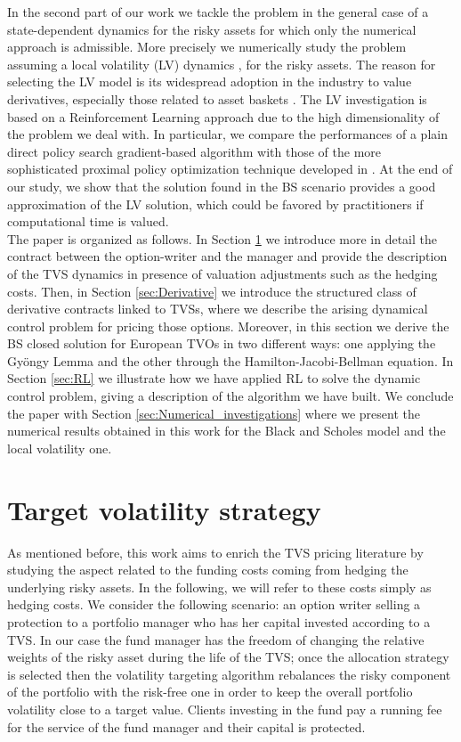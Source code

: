 \documentclass[runningheads]{m2ef}
\begin{document}
	In the second part of our work we tackle the problem in the general case of a state-dependent dynamics for the risky assets for which only the numerical approach is admissible.
	More precisely we numerically study the problem assuming a local volatility (LV) dynamics \cite{Derman1994}, \cite{Dupire1994} for the risky assets. The reason for selecting the LV model is its widespread adoption in the industry to value derivatives, especially those related to asset baskets \cite{Gatheral2006}. The LV investigation is based on a Reinforcement Learning approach due to the high dimensionality of the problem we deal with. In particular, we compare the performances of a plain direct policy search gradient-based algorithm \cite{Sutton2018} with those of the more sophisticated proximal policy optimization technique developed in \cite{Schulman2017}. At the end of our study, we show that the solution found in the BS scenario provides a good approximation of the LV solution, which could be favored by practitioners if computational time is valued.
	\\

	The paper is organized as follows. In Section \ref{sec:TVS} we introduce more in detail the contract between the option-writer and the manager and provide the description of the TVS dynamics in presence of valuation adjustments such as the hedging costs. Then, in Section \ref{sec:Derivative} we introduce the structured class of derivative contracts linked to TVSs, where we describe the arising dynamical control problem for pricing those options. Moreover, in this section we derive the BS closed solution for European TVOs in two different ways: one applying the Gy\"ongy Lemma and the other through the Hamilton-Jacobi-Bellman equation. In Section \ref{sec:RL} we illustrate how we have applied RL to solve the dynamic control problem, giving a description of the algorithm we have built. We conclude the paper with Section \ref{sec:Numerical_investigations} where we present the numerical results obtained in this work for the Black and Scholes model and the local volatility one.

	\section{Target volatility strategy}\label{sec:TVS}
	As mentioned before, this work aims to enrich the TVS pricing literature by studying the aspect related to the funding costs coming from hedging the underlying risky assets. In the following, we will refer to these costs simply as hedging costs. We consider the following scenario: an option writer selling a protection to a portfolio manager who has her capital invested according to a TVS. In our case the fund manager has the freedom of changing the relative weights of the risky asset during the life of the TVS; once the allocation strategy is selected then the volatility targeting algorithm rebalances the risky component of the portfolio with the risk-free one in order to keep the overall portfolio volatility close to a target value. Clients investing in the fund pay a running fee for the service of the fund manager and their capital is protected. 
\end{document}
